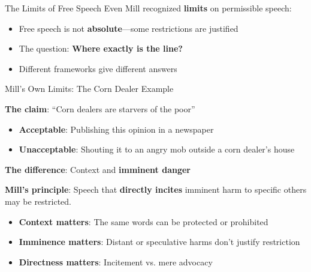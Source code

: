 ﻿\documentclass[aspectratio=169]{beamer}
\begin{document}
\begin{frame}{The Limits of Free Speech}
Even Mill recognized \textbf{limits} on permissible speech:

\begin{itemize}
    \item Free speech is not \textbf{absolute}---some restrictions are justified
    \item The question: \textbf{Where exactly is the line?}
    \item Different frameworks give different answers
\end{itemize}

\vspace{0.4cm}
\begin{center}
\end{center}
\end{frame}

\begin{frame}{Mill's Own Limits: The Corn Dealer Example}
\begin{casestudybox}
\textbf{The claim}: ``Corn dealers are starvers of the poor''

\begin{itemize}
    \item \textbf{Acceptable}: Publishing this opinion in a newspaper
    \item \textbf{Unacceptable}: Shouting it to an angry mob outside a corn dealer's house
\end{itemize}

\textbf{The difference}: Context and \textbf{imminent danger}
\end{casestudybox}

\vspace{0.3cm}
\textbf{Mill's principle}: Speech that \textbf{directly incites} imminent harm to specific others may be restricted.

\vspace{0.2cm}
\begin{itemize}
    \item \textbf{Context matters}: The same words can be protected or prohibited
    \item \textbf{Imminence matters}: Distant or speculative harms don't justify restriction
    \item \textbf{Directness matters}: Incitement vs. mere advocacy
\end{itemize}
\end{frame}
\end{document}
